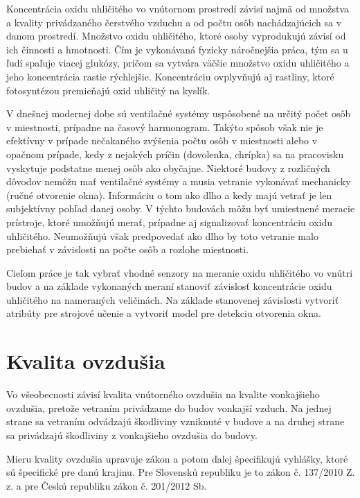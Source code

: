Koncentrácia oxidu uhličitého vo vnútornom prostredí závisí najmä od množstva a kvality privádzaného čerstvého vzduchu a od počtu osôb nachádzajúcich sa v danom prostredí. Množstvo oxidu uhličitého, ktoré osoby vyprodukujú závisí od ich činnosti a hmotnosti. Čím je vykonávaná fyzicky náročnejšia práca, tým sa u ľudí spaľuje viacej glukózy, pričom sa vytvára väčšie množstvo oxidu uhličitého a jeho koncentrácia rastie rýchlejšie. Koncentráciu ovplyvňujú aj rastliny, ktoré fotosyntézou premieňajú oxid uhličitý na kyslík.

V dnešnej modernej dobe sú ventilačné systémy uspôsobené na určitý počet osôb v miestnosti, prípadne na časový harmonogram. Takýto spôsob však nie je efektívny v prípade nečakaného zvýšenia počtu osôb v miestnosti alebo v opačnom prípade, kedy z nejakých príčin (dovolenka, chrípka) sa na pracovisku vyskytuje podstatne menej osôb ako obyčajne. Niektoré budovy z rozličných dôvodov nemôžu mať ventilačné systémy a musia vetranie vykonávať mechanicky (ručné otvorenie okna). Informáciu o tom ako dlho a kedy majú vetrať je len subjektívny pohľad danej osoby. V týchto budovách môžu byť umiestnené meracie prístroje, ktoré  umožňujú merať, prípadne aj signalizovať koncentráciu oxidu uhličitého. Neumožňujú však predpovedať ako dlho by toto vetranie malo prebiehať v závislosti na počte osôb a rozlohe miestnosti. 

Cieľom práce je tak vybrať vhodné senzory na meranie oxidu uhličitého vo vnútri budov a na základe vykonaných meraní stanoviť závislosť koncentrácie oxidu uhličitého na nameraných veličinách. Na základe stanovenej závislosti vytvoriť atribúty pre strojové učenie a vytvoriť model pre detekciu otvorenia okna.


\chapter{Kvalita ovzdušia}
Vo všeobecnosti závisí kvalita vnútorného ovzdušia na kvalite vonkajšieho ovzdušia, pretože vetraním privádzame do budov vonkajší vzduch. Na jednej strane sa vetraním odvádzajú škodliviny vzniknuté v budove a na druhej strane sa privádzajú škodliviny z vonkajšieho ovzdušia do budovy.

Mieru kvality ovzdušia upravuje zákon a potom ďalej špecifikujú vyhlášky, ktoré sú špecifické pre danú krajinu. Pre Slovenskú republiku je to zákon č. 137/2010 Z. z. a pre Českú republiku zákon č. 201/2012 Sb.

